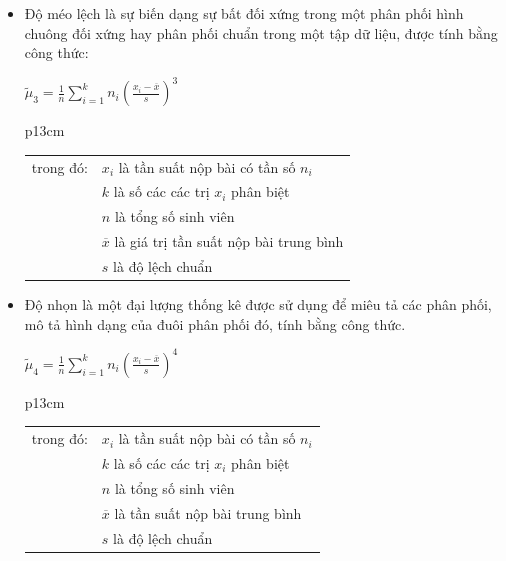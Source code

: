 \documentclass[a4paper]{article}
\theoremstyle{definition}
\begin{document}
\begin{enumerate}[a)]
\begin{itemize}
        \begin{itemize}
            \item Độ méo lệch là sự biến dạng sự bất đối xứng trong một phân phối hình chuông đối xứng hay phân phối chuẩn trong một tập dữ liệu, được tính bằng công thức:
            \begin{center}
                $\tilde{\mu}_3 = \frac{1}{n} \sum \limits_{i=1}^{k} n_i (\frac{x_i - \overline{x}}{s})^3$
                \begin{tabular}{p{13cm}}
                    \begin{tabular}{l l}
                        trong đó: & $x_i$ là tần suất nộp bài có tần số $n_i$\\
                        & $k$ là số các các trị $x_i$ phân biệt\\
                        & $n$ là tổng số sinh viên\\
                        & $\overline{x}$ là giá trị tần suất nộp bài trung bình\\
                        & $s$ là độ lệch chuẩn
                    \end{tabular}
                \end{tabular}
            \end{center}
            \item Độ nhọn là một đại lượng thống kê được sử dụng để miêu tả các phân phối, mô tả hình dạng của đuôi phân phối đó, tính bằng công thức.
            \begin{center}
                $\tilde{\mu}_4 = \frac{1}{n} \sum \limits_{i=1}^{k} n_i (\frac{x_i - \overline{x}}{s})^4$
                \begin{tabular}{p{13cm}}
                    \begin{tabular}{l l}
                        trong đó: & $x_i$ là tần suất nộp bài có tần số $n_i$\\
                        & $k$ là số các các trị $x_i$ phân biệt\\
                        & $n$ là tổng số sinh viên\\
                        & $\overline{x}$ là tần suất nộp bài trung bình\\
                        & $s$ là độ lệch chuẩn
                    \end{tabular}
                \end{tabular}
            \end{center}
        \end{itemize}
    \end{itemize}

\end{enumerate}
\end{document}
